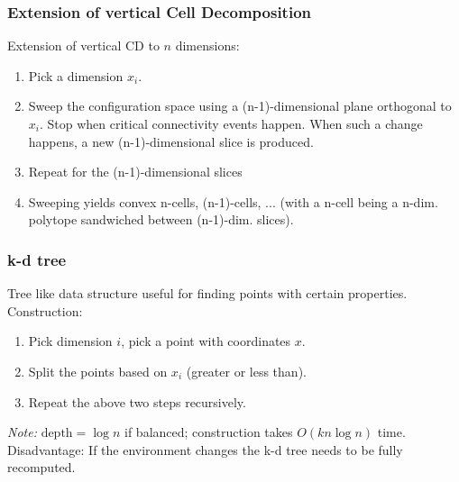 \begin{multicols*}{2}
\subsubsection{Extension of vertical Cell Decomposition}
Extension of vertical CD to $n$ dimensions:
\begin{enumerate}
	\item Pick a dimension $x_i$.
	\item Sweep the configuration space using a (n-1)-dimensional plane orthogonal to $x_i$. Stop when critical connectivity events happen. When such a change happens, a new (n-1)-dimensional slice is produced.
	\item Repeat for the (n-1)-dimensional slices
	\item Sweeping yields convex n-cells, (n-1)-cells, ... (with a n-cell being a n-dim. polytope sandwiched between (n-1)-dim. slices).
\end{enumerate}

\subsubsection{k-d tree}
Tree like data structure useful for finding points with certain properties. Construction:
\begin{enumerate}
	\item Pick dimension $i$, pick a point with coordinates $x$.
	\item Split the points based on $x_i$ (greater or less than).
	\item Repeat the above two steps recursively.
\end{enumerate}
\textit{Note:} $\text{depth} = \log n$ if balanced; construction takes $O(kn \log n)$ time.\\
Disadvantage: If the environment changes the k-d tree needs to be fully recomputed.


\end{multicols*}
